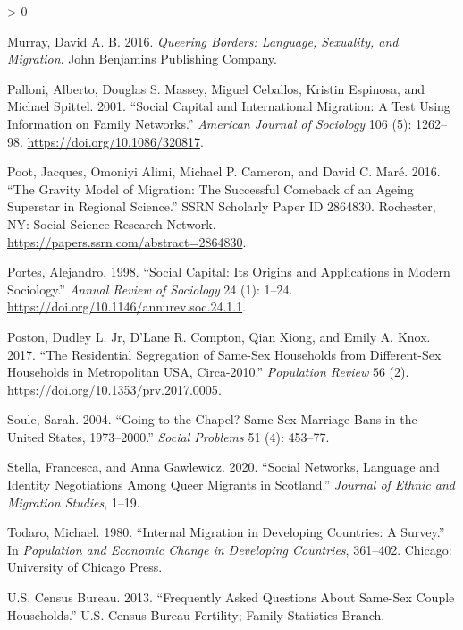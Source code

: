 \documentclass[
  11pt,
]{article}
\newlength{\cslhangindent}
\newenvironment{CSLReferences}[2] %
 {%
  \setlength{\parindent}{0pt}
  \ifodd #1 \everypar{\setlength{\hangindent}{\cslhangindent}}\ignorespaces\fi
  \ifnum #2 > 0
  \setlength{\parskip}{#2\baselineskip}
  \fi
 }%
 {}
\begin{document}
\begin{CSLReferences}{1}{0}
\leavevmode\hypertarget{ref-murray_2016}{}%
Murray, David A. B. 2016. \emph{Queering {Borders}: {Language}, {Sexuality}, and {Migration}}. John Benjamins Publishing Company.

\leavevmode\hypertarget{ref-palloni_2001}{}%
Palloni, Alberto, Douglas S. Massey, Miguel Ceballos, Kristin Espinosa, and Michael Spittel. 2001. {``Social {Capital} and {International} {Migration}: {A} {Test} {Using} {Information} on {Family} {Networks}.''} \emph{American Journal of Sociology} 106 (5): 1262--98. \url{https://doi.org/10.1086/320817}.

\leavevmode\hypertarget{ref-poot_2016}{}%
Poot, Jacques, Omoniyi Alimi, Michael P. Cameron, and David C. Maré. 2016. {``The {Gravity} {Model} of {Migration}: {The} {Successful} {Comeback} of an {Ageing} {Superstar} in {Regional} {Science}.''} SSRN Scholarly Paper ID 2864830. Rochester, NY: Social Science Research Network. \url{https://papers.ssrn.com/abstract=2864830}.

\leavevmode\hypertarget{ref-portes_1998}{}%
Portes, Alejandro. 1998. {``Social {Capital}: {Its} {Origins} and {Applications} in {Modern} {Sociology}.''} \emph{Annual Review of Sociology} 24 (1): 1--24. \url{https://doi.org/10.1146/annurev.soc.24.1.1}.

\leavevmode\hypertarget{ref-poston_2017}{}%
Poston, Dudley L. Jr, D'Lane R. Compton, Qian Xiong, and Emily A. Knox. 2017. {``The {Residential} {Segregation} of {Same}-{Sex} {Households} from {Different}-{Sex} {Households} in {Metropolitan} {USA}, Circa-2010.''} \emph{Population Review} 56 (2). \url{https://doi.org/10.1353/prv.2017.0005}.

\leavevmode\hypertarget{ref-soule_2004}{}%
Soule, Sarah. 2004. {``Going to the Chapel? {Same}-Sex Marriage Bans in the {United} {States}, 1973--2000.''} \emph{Social Problems} 51 (4): 453--77.

\leavevmode\hypertarget{ref-stella_2020}{}%
Stella, Francesca, and Anna Gawlewicz. 2020. {``Social Networks, Language and Identity Negotiations Among Queer Migrants in {Scotland}.''} \emph{Journal of Ethnic and Migration Studies}, 1--19.

\leavevmode\hypertarget{ref-todaro_1980}{}%
Todaro, Michael. 1980. {``Internal Migration in Developing Countries: A Survey.''} In \emph{Population and Economic Change in Developing Countries}, 361--402. Chicago: University of Chicago Press.

\leavevmode\hypertarget{ref-u.s.censusbureau_2013}{}%
U.S. Census Bureau. 2013. {``Frequently {Asked} {Questions} {About} {Same}-{Sex} {Couple} {Households}.''} U.S. Census Bureau Fertility; Family Statistics Branch.


\end{CSLReferences}
\end{document}
